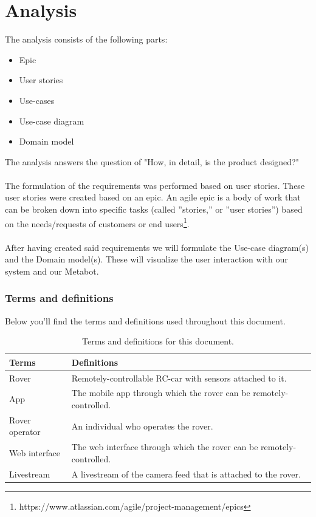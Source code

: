 \documentclass[12pt]{article}
\begin{document}
	\section{Analysis}
	The analysis consists of the following parts:
	\begin{itemize}
		\item Epic
		\item User stories
		\item Use-cases
		\item Use-case diagram
		\item Domain model\\
	\end{itemize}	
	The analysis answers the question of "How, in detail, is the product designed?"\\
	\\The formulation of the requirements was performed based on user stories. These user stories were created based on an epic. An agile epic is a body of work that can be broken down into specific tasks (called ''stories,'' or ''user stories'') based on the needs/requests of customers or end users\footnote{https://www.atlassian.com/agile/project-management/epics}.\\
	\\After having created said requirements we will formulate the Use-case diagram(s) and the Domain model(s). These will visualize the user interaction with our system and our Metabot.
	\subsubsection{Terms and definitions}
	Below you'll find the terms and definitions used throughout this document.
	\begin{table}[H]
		\centering
		\begin{tabularx}{\linewidth}{|X|X|}
			\hline
			\textbf{Terms} &\textbf{Definitions}\\
			\hline
			Rover &Remotely-controllable RC-car with sensors attached to it.\\
			\hline
			App &The mobile app through which the rover can be remotely-controlled.\\
			\hline
			Rover operator &An individual who operates the rover.\\
			\hline
			Web interface &The web interface through which the rover can be remotely-controlled. \\
			\hline 
			Livestream &A livestream of the camera feed that is attached to the rover.\\
			\hline
		\end{tabularx}
		\caption{Terms and definitions for this document.}
		\label{table:termsDefinition}   
	\end{table}
	\newpage
\end{document}

